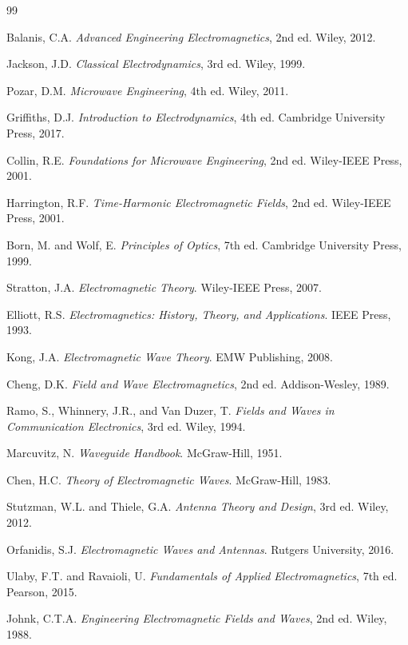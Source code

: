 \documentclass[a4paper, 11pt]{article}
\begin{document}
\begin{thebibliography}{99}

Balanis, C.A. \textit{Advanced Engineering Electromagnetics}, 2nd ed. Wiley, 2012.

Jackson, J.D. \textit{Classical Electrodynamics}, 3rd ed. Wiley, 1999.

Pozar, D.M. \textit{Microwave Engineering}, 4th ed. Wiley, 2011.

Griffiths, D.J. \textit{Introduction to Electrodynamics}, 4th ed. Cambridge University Press, 2017.

Collin, R.E. \textit{Foundations for Microwave Engineering}, 2nd ed. Wiley-IEEE Press, 2001.

Harrington, R.F. \textit{Time-Harmonic Electromagnetic Fields}, 2nd ed. Wiley-IEEE Press, 2001.

Born, M. and Wolf, E. \textit{Principles of Optics}, 7th ed. Cambridge University Press, 1999.

Stratton, J.A. \textit{Electromagnetic Theory}. Wiley-IEEE Press, 2007.

Elliott, R.S. \textit{Electromagnetics: History, Theory, and Applications}. IEEE Press, 1993.

Kong, J.A. \textit{Electromagnetic Wave Theory}. EMW Publishing, 2008.

Cheng, D.K. \textit{Field and Wave Electromagnetics}, 2nd ed. Addison-Wesley, 1989.

Ramo, S., Whinnery, J.R., and Van Duzer, T. \textit{Fields and Waves in Communication Electronics}, 3rd ed. Wiley, 1994.

Marcuvitz, N. \textit{Waveguide Handbook}. McGraw-Hill, 1951.

Chen, H.C. \textit{Theory of Electromagnetic Waves}. McGraw-Hill, 1983.

Stutzman, W.L. and Thiele, G.A. \textit{Antenna Theory and Design}, 3rd ed. Wiley, 2012.

Orfanidis, S.J. \textit{Electromagnetic Waves and Antennas}. Rutgers University, 2016.

Ulaby, F.T. and Ravaioli, U. \textit{Fundamentals of Applied Electromagnetics}, 7th ed. Pearson, 2015.

Johnk, C.T.A. \textit{Engineering Electromagnetic Fields and Waves}, 2nd ed. Wiley, 1988.

\end{thebibliography}
\end{document}

